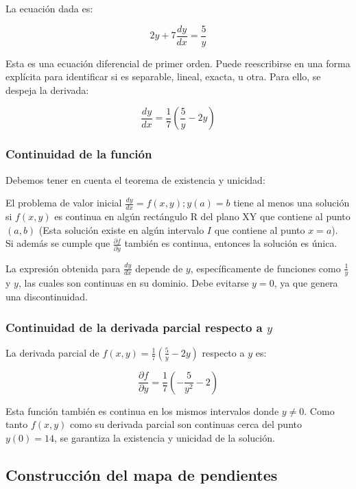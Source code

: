 \documentclass{article}
\begin{document}
La ecuación dada es:

\[
2y + 7\frac{dy}{dx} = \frac{5}{y}
\]

Esta es una ecuación diferencial de primer orden. Puede reescribirse en una forma explícita para identificar si es separable, lineal, exacta, u otra. Para ello, se despeja la derivada:

\[
\frac{dy}{dx} = \frac{1}{7} \left( \frac{5}{y} - 2y \right)
\]

\subsubsection*{Continuidad de la función}

Debemos tener en cuenta el teorema de existencia y unicidad: 

El problema de valor inicial \( \frac{dy}{dx} = f(x,y)  ; y(a) = b \) tiene al menos una solución si \( f(x,y) \) es continua en algún rectángulo R del plano XY que contiene al punto \( (a,b) \) (Esta solución existe en algún intervalo \(I\) que contiene al punto  \(x=a\)). \\
Si además se cumple que \(\frac{\partial f}{\partial y}\) también es continua, entonces la solución es única.
\vspace{0,5cm}

La expresión obtenida para \( \frac{dy}{dx} \) depende de \( y \), específicamente de funciones como \( \frac{1}{y} \) y \( y \), las cuales son continuas en su dominio. Debe evitarse \( y = 0 \), ya que genera una discontinuidad.

\subsubsection*{Continuidad de la derivada parcial respecto a \( y \)}

La derivada parcial de \( f(x, y) = \frac{1}{7} \left( \frac{5}{y} - 2y \right) \) respecto a \( y \) es:

\[
\frac{\partial f}{\partial y} = \frac{1}{7} \left( -\frac{5}{y^2} - 2 \right)
\]

Esta función también es continua en los mismos intervalos donde \( y \neq 0 \). Como tanto \( f(x, y) \) como su derivada parcial son continuas cerca del punto \( y(0) = 14 \), se garantiza la existencia y unicidad de la solución.

\subsection{Construcción del mapa de pendientes}
\end{document}
